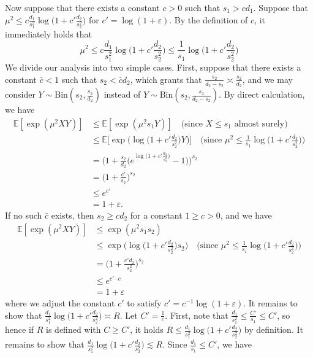 \documentclass{article}
\newcommand{\EE}{\mathbb{E}}
\newcommand{\eps}{\varepsilon} %
\theoremstyle{remark}
\begin{document}
Now suppose that there exists a constant $c > 0$ such that $s_1 > cd_1$. Suppose that $\mu^2 \leq c\frac{d_1}{s_1^2}\log\big(1 + c'\frac{d_2}{s_2^2}\big)$ for $c' = \log(1 + \eps)$. By the definition of $c$, it immediately holds that
\[\mu^2 \leq c\frac{d_1}{s_1^2}\log\big(1 + c'\frac{d_2}{s_2^2}\big) \leq \frac{1}{s_1}\log\big(1 + c'\frac{d_2}{s_2^2}\big)\]
We divide our analysis into two simple cases. First, suppose that there exists a constant $\bar{c} < 1$ such that $s_2 < \bar{c}d_2$, which grants that $\frac{s_2}{d_2 - s_2} \asymp \frac{s_2}{d_2}$, and we may consider $Y \sim \text{Bin}(s_2, \frac{s_2}{d_2})$ instead of $Y \sim \text{Bin}(s_2, \frac{s_2}{d_2 - s_2})$. By direct calculation, we have
\begin{align*}
    \EE[\exp(\mu^2XY)] &\leq \EE[\exp(\mu^2s_1Y)] \quad \text{(since $X \leq s_1$ almost surely)} \\
    &\leq \EE\Big[\exp\Big(\log\big(1+c'\frac{d_2}{s_2^2}\big)Y\Big)\Big] \quad \text{(since $\mu^2\leq \frac{1}{s_1}\log\big(1 + c'\frac{d_2}{s_2^2}\big)$)} \\
    &= \Big(1 + \frac{s_2}{d_2}\big(e^{\log\big(1 + c'\frac{d_2}{s_2^2}\big)} - 1\big)\Big)^{s_2} \\
    &= \big(1 + \frac{c'}{s_2}\big)^{s_2} \\
    &\leq e^{c'} \\
    &= 1 + \eps.
\end{align*}
If no such $\bar{c}$ exists, then $s_2 \geq c d_2$ for a constant $1 \geq c > 0$, and we have
\begin{align*}
    \EE[\exp(\mu^2XY)] &\leq \exp(\mu^2s_1s_2) \\
    &\leq \exp\Big(\log\big(1+c'\frac{d_2}{s_2^2}\big)s_2\Big) \quad \text{(since $\mu^2\leq \frac{1}{s_1}\log\big(1 + c'\frac{d_2}{s_2^2}\big)$)} \\
    &= \big(1 + \frac{c'd_2}{s^2_2}\big)^{s_2} \\
    &\leq e^{c' \cdot c } \\
    &= 1 + \eps
\end{align*}
where we adjust the constant $c'$ to satisfy $c' = c^{-1}\log(1 + \eps)$. It remains to show that $\frac{d_1}{s_1^2}\log\big(1 + c'\frac{d_2}{s_2^2}\big) \asymp R$. Let $C' = \frac1c$. First, note that $\frac{d_1}{s_1^2} \leq \frac{C'}{s_1} \leq C'$, so hence if $R$ is defined with $C \geq C'$, it holds $R \leq \frac{d_1}{s_1^2}\log\big(1 + c'\frac{d_2}{s_2^2}\big)$ by definition. It remains to show that $\frac{d_1}{s_1^2}\log\big(1 + c'\frac{d_2}{s_2^2}\big) \lesssim R$. Since $\frac{d_1}{s_1} \leq C'$, we have
\end{document}
